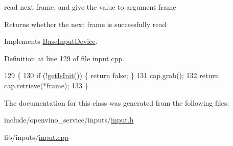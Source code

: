 read next frame, and give the value to argument frame 

\begin{DoxyReturn}{Returns}
whether the next frame is successfully read 
\end{DoxyReturn}


Implements \hyperlink{classBaseInputDevice_a49b0a9ff7286d5fb3bccf61a0baaa32a}{Base\+Input\+Device}.



Definition at line 129 of file input.\+cpp.


\begin{DoxyCode}
129                              \{
130   \textcolor{keywordflow}{if} (!\hyperlink{classBaseInputDevice_a560fe86d007739992af04198237909a5}{getIsInit}()) \{ \textcolor{keywordflow}{return} \textcolor{keyword}{false}; \}
131   cap.grab();
132   \textcolor{keywordflow}{return} cap.retrieve(*frame);
133 \}
\end{DoxyCode}


The documentation for this class was generated from the following files\+:\begin{DoxyCompactItemize}
\item 
include/openvino\+\_\+service/inputs/\hyperlink{input_8h}{input.\+h}\item 
lib/inputs/\hyperlink{input_8cpp}{input.\+cpp}\end{DoxyCompactItemize}
